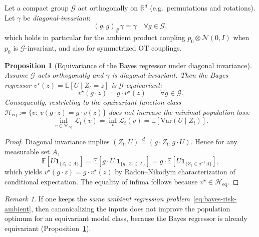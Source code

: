 \documentclass{article}
\theoremstyle{plain}
\newtheorem{proposition}[theorem]{Proposition}
\theoremstyle{definition}
\theoremstyle{remark}
\newtheorem{remark}[theorem]{Remark}
\newcommand{\1}{\mathbf{1}}
\begin{document}
Let a compact group $\mathcal G$ act orthogonally on $\mathbb R^d$ (e.g.\ permutations and rotations).
Let $\gamma$ be \emph{diagonal-invariant}:
\begin{equation}
(g,g)_{\#}\gamma=\gamma\quad \forall g\in\mathcal G,
\end{equation}
which holds in particular for the ambient product coupling $p_0\otimes\mathcal N(0,I)$ when $p_0$ is $\mathcal G$-invariant,
and also for symmetrized OT couplings.

\begin{proposition}[Equivariance of the Bayes regressor under diagonal invariance]
\label{prop:bayes-equivariant}
Assume $\mathcal G$ acts orthogonally and $\gamma$ is diagonal-invariant.
Then the Bayes regressor $v^\star(z)=\mathbb E[U\mid Z_t=z]$ is $\mathcal G$-equivariant:
\begin{equation}
v^\star(g\cdot z)=g\cdot v^\star(z)\qquad \forall g\in\mathcal G.
\end{equation}
Consequently, restricting to the equivariant function class
$\mathcal H_{\mathrm{eq}}:=\{v:\ v(g\cdot z)=g\cdot v(z)\}$ does \emph{not} increase the minimal population loss:
\begin{equation}
\inf_{v\in\mathcal H_{\mathrm{eq}}}\mathcal L_t(v)=\inf_v \mathcal L_t(v)=\mathbb E[\mathrm{Var}(U\mid Z_t)].
\end{equation}
\end{proposition}

\begin{proof}
Diagonal invariance implies $(Z_t,U)\stackrel{d}{=}(g\cdot Z_t, g\cdot U)$.
Hence for any measurable set $A$,
\begin{equation}
\mathbb E[U\mathbf 1_{\{Z_t\in A\}}]
=\mathbb E[g\cdot U\ \mathbf 1_{\{g\cdot Z_t\in A\}}]
=g\cdot \mathbb E[U\mathbf 1_{\{Z_t\in g^{-1}A\}}],
\end{equation}
which yields $v^\star(g\cdot z)=g\cdot v^\star(z)$ by Radon--Nikodym characterization of conditional expectation.
The equality of infima follows because $v^\star\in\mathcal H_{\mathrm{eq}}$.
\end{proof}

\begin{remark}
If one keeps the \emph{same ambient regression problem}~\eqref{eq:bayes-risk-ambient}, then canonicalizing the inputs does not improve the population optimum for an equivariant model class, because the Bayes regressor is already equivariant (Proposition~\ref{prop:bayes-equivariant}). 
\end{remark}
\end{document}

